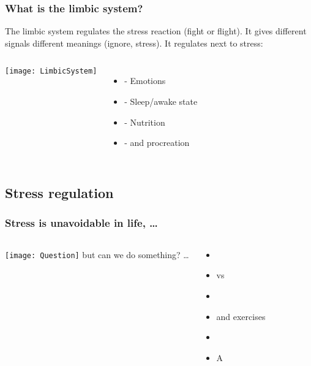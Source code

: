 \documentclass[../main.tex]{subfiles}
\begin{document}
\begin{frame}
  \frametitle{What is the limbic system?}
  The limbic system regulates the stress reaction (fight or flight). It gives different signals different meanings (ignore, stress).
  It regulates next to stress:

\vspace{5mm}
  \begin{columns}[c] %
\texttt{[image: LimbicSystem]}

  \begin{itemize}
  \item - Emotions
  \item - Sleep/awake state
  \item - Nutrition
  \item - and procreation
  \end{itemize}

\end{columns}

\end{frame}

\subsection{Stress regulation}

\begin{frame}
\frametitle{Stress is unavoidable in life, \ldots}
\begin{columns}[c] %
\texttt{[image: Question]}
 but can we do something? \ldots 
 \begin{itemize}
 \item {}
 \item {} vs 
 \item {} 
 \item {} and  exercises
 \item {}
 \item A  
 \end{itemize}
\end{columns}
\end{frame}
\end{document}
